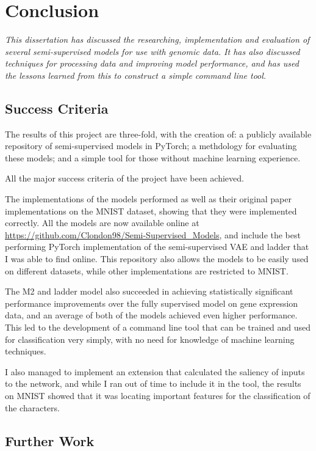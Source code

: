 \chapter{Conclusion}

\textit{This dissertation has discussed the researching, implementation and evaluation of several semi-supervised models for use with genomic
data. It has also discussed techniques for processing data and improving model performance, and has used the lessons learned from 
this to construct a simple command line tool.}

\section{Success Criteria}

The results of this project are three-fold, with the creation of: a publicly available repository of semi-supervised models in PyTorch; 
a methdology for evaluating these models; and a simple tool for those without machine learning experience.

All the major success criteria of the project have been achieved. 

The implementations of the models performed as well as their original paper implementations on the MNIST dataset, showing that they were 
implemented correctly. All the models are now available online at \url{https://github.com/Clondon98/Semi-Supervised_Models}, and include the 
best performing PyTorch implementation of the semi-supervised VAE and ladder that I was able to find online. This repository also allows 
the models to be easily used on different datasets, while other implementations are restricted to MNIST. 

The M2 and ladder model also succeeded in achieving statistically significant performance improvements over the fully supervised model on 
gene expression data, and an average of both of the models achieved even higher performance. This led to the development of a 
command line tool that can be trained and used for classification very simply, with no need for knowledge of machine learning techniques.

I also managed to implement an extension that calculated the saliency of inputs to the network, and while I ran out of time to include it 
in the tool, the results on MNIST showed that it was locating important features for the classification of the characters.

\section{Further Work}


